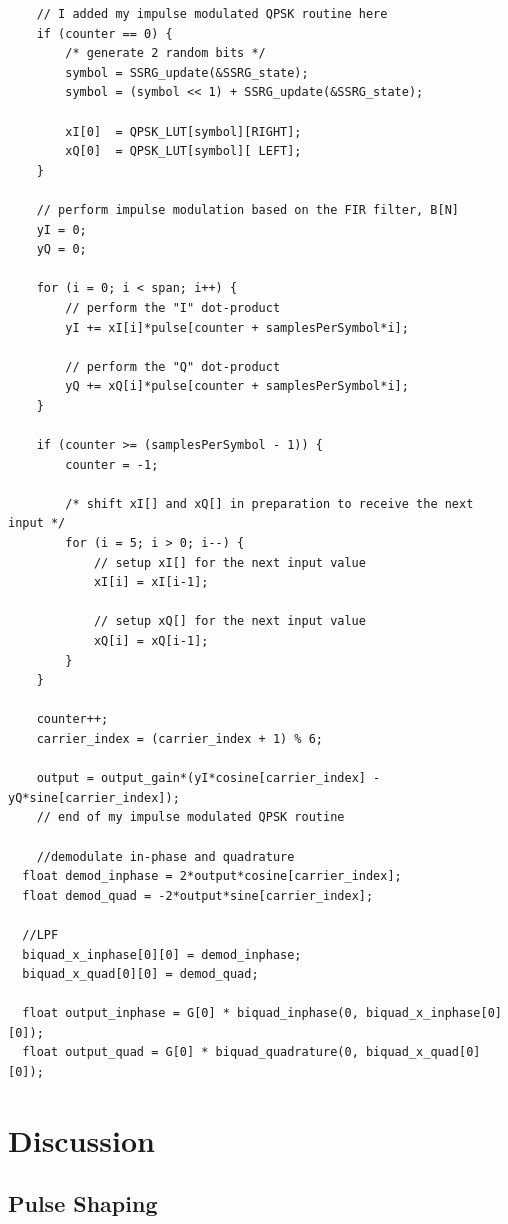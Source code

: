 \documentclass{article}
\begin{document}
\begin{verbatim}
	// I added my impulse modulated QPSK routine here
	if (counter == 0) {
		/* generate 2 random bits */
		symbol = SSRG_update(&SSRG_state); 
		symbol = (symbol << 1) + SSRG_update(&SSRG_state);

		xI[0]  = QPSK_LUT[symbol][RIGHT];  
		xQ[0]  = QPSK_LUT[symbol][ LEFT];   
	}

	// perform impulse modulation based on the FIR filter, B[N]
	yI = 0;
	yQ = 0;

	for (i = 0; i < span; i++) {
		// perform the "I" dot-product
		yI += xI[i]*pulse[counter + samplesPerSymbol*i];	

		// perform the "Q" dot-product
		yQ += xQ[i]*pulse[counter + samplesPerSymbol*i];	
	}

	if (counter >= (samplesPerSymbol - 1)) {
		counter = -1; 

		/* shift xI[] and xQ[] in preparation to receive the next input */
		for (i = 5; i > 0; i--) {
			// setup xI[] for the next input value
			xI[i] = xI[i-1];  

			// setup xQ[] for the next input value
			xQ[i] = xQ[i-1];  
		}
	}

	counter++;
	carrier_index = (carrier_index + 1) % 6;

	output = output_gain*(yI*cosine[carrier_index] - yQ*sine[carrier_index]);
	// end of my impulse modulated QPSK routine

	//demodulate in-phase and quadrature
  float demod_inphase = 2*output*cosine[carrier_index];
  float demod_quad = -2*output*sine[carrier_index];

  //LPF
  biquad_x_inphase[0][0] = demod_inphase;
  biquad_x_quad[0][0] = demod_quad;

  float output_inphase = G[0] * biquad_inphase(0, biquad_x_inphase[0][0]);
  float output_quad = G[0] * biquad_quadrature(0, biquad_x_quad[0][0]);
\end{verbatim}


\section{Discussion}

\subsection{Pulse Shaping}
\end{document}
